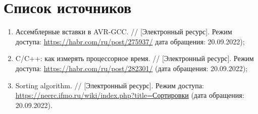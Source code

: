 %



\section*{\large Список источников}
\begin{enumerate}
	\item Ассемблерные вставки в AVR-GCC. // [Электронный ресурс]. Режим доступа: \url{https://habr.com/ru/post/275937/} дата обращения: 20.09.2022); 
	\item C/C++: как измерять процессорное время. // [Электронный ресурс]. Режим доступа: \url{https://habr.com/ru/post/282301/} (дата обращения: 20.09.2022);
	\item Sorting algorithm. // [Электронный ресурс]. Режим доступа: 
	\url{https://neerc.ifmo.ru/wiki/index.php?title=Сортировки} (дата обращения: 20.09.2022).
\end{enumerate}